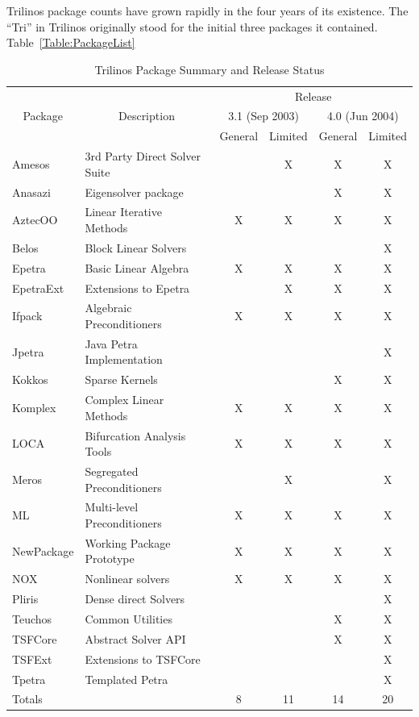 \documentclass[acmtoms,acmnow]{acmtrans2m}
\begin{document}
Trilinos package counts have grown rapidly in the four years of its
existence.  The ``Tri'' in Trilinos originally stood for the initial
three packages it contained.  Table~\ref{Table:PackageList}
\begin{table}
\begin{center}
\begin{tabular}{|l|l|c|c|c|c|}\hline
        &             & \multicolumn{4}{|c|}{Release} \\
\multicolumn{1}{|c|}{Package} &
\multicolumn{1}{|c|}{Description} &
\multicolumn{2}{|c|}{3.1 (Sep 2003)} &
\multicolumn{2}{|c|}{4.0 (Jun 2004)}\\
          &   & General & Limited &General &Limited \\\hline
Amesos& 3rd Party Direct Solver Suite  &  & X& X& X \\\hline
Anasazi& Eigensolver package           &  &  & X& X \\\hline
AztecOO& Linear Iterative Methods      & X& X& X& X \\\hline
Belos& Block Linear Solvers            &  &  &  & X \\\hline
Epetra& Basic Linear Algebra           & X& X& X& X \\\hline
EpetraExt& Extensions to Epetra        &  & X& X& X \\\hline
Ifpack& Algebraic Preconditioners      & X& X& X& X \\\hline
Jpetra& Java Petra Implementation      &  &  &  & X \\\hline
Kokkos& Sparse Kernels                 &  &  & X& X \\\hline
Komplex& Complex Linear Methods        & X& X& X& X \\\hline
LOCA& Bifurcation Analysis Tools       & X& X& X& X \\\hline
Meros& Segregated Preconditioners      &  & X&  & X \\\hline
ML& Multi-level Preconditioners        & X& X& X& X \\\hline
NewPackage& Working Package Prototype  & X& X& X& X \\\hline
NOX& Nonlinear solvers                 & X& X& X& X \\\hline
Pliris& Dense direct Solvers           &  &  &  & X \\\hline
Teuchos& Common Utilities              &  &  & X& X \\\hline
TSFCore& Abstract Solver API           &  &  & X& X \\\hline
TSFExt& Extensions to TSFCore          &  &  &  & X \\\hline
Tpetra& Templated Petra                &  &  &  & X \\\hline\hline
Totals&                                & 8&11&14&20 \\\hline
\end{tabular}
\caption{\label{Table:PackageLists} Trilinos Package Summary and
Release Status}
\end{center}
\end{table}
\end{document}
